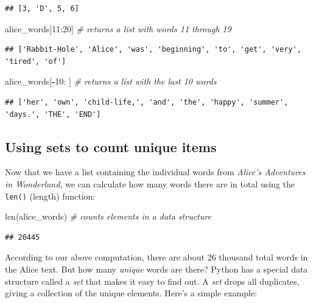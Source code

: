 \documentclass[]{book}
\newenvironment{Shaded}{\begin{snugshade}}{\end{snugshade}}
\newcommand{\BuiltInTok}[1]{#1}
\newcommand{\CommentTok}[1]{\textcolor[rgb]{0.56,0.35,0.01}{\textit{#1}}}
\newcommand{\DecValTok}[1]{\textcolor[rgb]{0.00,0.00,0.81}{#1}}
\newcommand{\NormalTok}[1]{#1}
\newcommand{\OperatorTok}[1]{\textcolor[rgb]{0.81,0.36,0.00}{\textbf{#1}}}
\begin{document}
\begin{verbatim}
## [3, 'D', 5, 6]
\end{verbatim}

\begin{Shaded}
\begin{Highlighting}[]
\NormalTok{alice_words[}\DecValTok{11}\NormalTok{:}\DecValTok{20}\NormalTok{] }\CommentTok{# returns a list with words 11 through 19}
\end{Highlighting}
\end{Shaded}

\begin{verbatim}
## ['Rabbit-Hole', 'Alice', 'was', 'beginning', 'to', 'get', 'very', 'tired', 'of']
\end{verbatim}

\begin{Shaded}
\begin{Highlighting}[]
\NormalTok{alice_words[}\OperatorTok{-}\DecValTok{10}\NormalTok{: ] }\CommentTok{# returns a list with the last 10 words}
\end{Highlighting}
\end{Shaded}

\begin{verbatim}
## ['her', 'own', 'child-life,', 'and', 'the', 'happy', 'summer', 'days.', 'THE', 'END']
\end{verbatim}

\hypertarget{using-sets-to-count-unique-items}{%
\subsection{Using sets to count unique items}\label{using-sets-to-count-unique-items}}

Now that we have a list containing the individual words from \emph{Alice's Adventures in Wonderland}, we can calculate how many words there are in total using the \texttt{len()} (length) function:

\begin{Shaded}
\begin{Highlighting}[]
\BuiltInTok{len}\NormalTok{(alice_words) }\CommentTok{# counts elements in a data structure}
\end{Highlighting}
\end{Shaded}

\begin{verbatim}
## 26445
\end{verbatim}

According to our above computation, there are about 26 thousand total words in the Alice text. But how many \emph{unique} words are there? Python has a special data structure called a \emph{set} that makes it easy to find out. A \emph{set} drops all duplicates, giving a collection of the unique elements. Here's a simple example:
\end{document}
